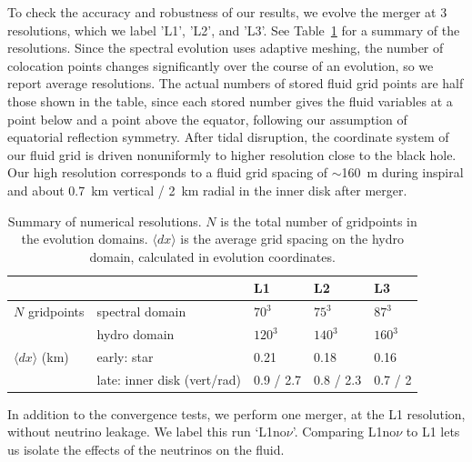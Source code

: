 To check the accuracy and robustness of our results, we evolve
the merger at 3 resolutions, which we label 'L1',
'L2', and 'L3'. See Table~\ref{tab:resolutions} for a
summary of the resolutions.  Since the
spectral evolution uses adaptive meshing, the number of colocation
points changes significantly over the course of an evolution, so
we report average resolutions.  The actual numbers of stored fluid
grid points are half those shown in the table, since each stored number
gives the fluid variables at a point below and a point above the
equator, following our assumption of equatorial reflection symmetry. 
After tidal disruption, the coordinate system of our fluid grid
is driven nonuniformly to higher resolution close to the black hole.
Our high resolution corresponds to a fluid grid spacing of $\sim$160~m during
inspiral and about 0.7~km vertical / 2~km radial in the inner
disk after merger.

\begin{table}
  \centering
  \begin{tabular}{ l l l l l }
    \toprule
                    &                             & L1        & L2        & L3 \\
    \midrule
    $N$ gridpoints  & spectral domain             & $70^3$    & $75^3$    & $87^3$ \\
                    & hydro domain                & $120^3$   & $140^3$   & $160^3$ \\
    \midrule
    $\langle dx \rangle$ (km) & early: star       & 0.21      & 0.18      & 0.16 \\
                    & late: inner disk (vert/rad) & 0.9 / 2.7 & 0.8 / 2.3 & 0.7 / 2 \\
    \bottomrule
  \end{tabular}
  \caption[Summary of simulation resolutions]{
    Summary of numerical resolutions. $N$ is the total number of gridpoints in the
    evolution domains. $\langle dx \rangle$ is the average grid spacing on the hydro
    domain, calculated in evolution coordinates.
  }
  \label{tab:resolutions}
\end{table}

In addition to the convergence tests, we perform one merger, at the
L1 resolution, without neutrino leakage.  We label this
run `L1no$\nu$'.  Comparing L1no$\nu$ to L1 lets us isolate
the effects of the neutrinos on the fluid.


